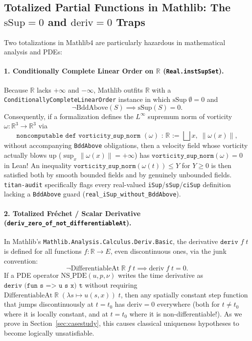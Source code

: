 \documentclass[11pt,a4paper]{article}
\theoremstyle{plain}
\theoremstyle{definition}
\begin{document}
\subsection{Totalized Partial Functions in Mathlib: The $\mathrm{sSup} = 0$ and $\mathrm{deriv} = 0$ Traps}

Two totalizations in Mathlib4 are particularly hazardous in mathematical analysis and PDEs:

\paragraph{1. Conditionally Complete Linear Order on $\mathbb{R}$ (\texttt{Real.instSupSet}).}
Because $\mathbb{R}$ lacks $+\infty$ and $-\infty$, Mathlib outfits $\mathbb{R}$ with a \texttt{ConditionallyCompleteLinearOrder} instance in which $\mathrm{sSup}\;\emptyset = 0$ and
\[
  \neg \mathrm{BddAbove}(S) \implies \mathrm{sSup}(S) = 0.
\]
Consequently, if a formalization defines the $L^\infty$ supremum norm of vorticity $\omega : \mathbb{R}^3 \to \mathbb{R}^3$ via
\[
  \texttt{noncomputable def vorticity\_sup\_norm }(\omega)\texttt{ : }\mathbb{R}\texttt{ := }\bigsqcup x,\; \|\omega(x)\|,
\]
without accompanying \texttt{BddAbove} obligations, then a velocity field whose vorticity actually blows up ($\sup_x \|\omega(x)\| = +\infty$) has $\texttt{vorticity\_sup\_norm}(\omega) = 0$ in Lean! An inequality $\texttt{vorticity\_sup\_norm}(\omega(t)) \le Y$ for $Y \ge 0$ is then satisfied both by smooth bounded fields and by genuinely unbounded fields. \texttt{titan-audit} specifically flags every real-valued \texttt{iSup}/\texttt{sSup}/\texttt{ciSup} definition lacking a \texttt{BddAbove} guard (\texttt{real\_iSup\_without\_BddAbove}).

\paragraph{2. Totalized Fr\'echet / Scalar Derivative (\texttt{deriv\_zero\_of\_not\_differentiableAt}).}
In Mathlib's \texttt{Mathlib.Analysis.Calculus.Deriv.Basic}, the derivative $\texttt{deriv } f\; t$ is defined for all functions $f : \mathbb{R} \to E$, even discontinuous ones, via the junk convention:
\[
  \neg \mathrm{DifferentiableAt}\;\mathbb{R}\;f\;t \implies \mathrm{deriv}\;f\;t = 0.
\]
If a PDE operator $\mathrm{NS\_PDE}(u, p, \nu)$ writes the time derivative as $\texttt{deriv (fun s => u s x) t}$ without requiring $\mathrm{DifferentiableAt}\;\mathbb{R}\;(\lambda s \mapsto u(s,x))\;t$, then any spatially constant step function that jumps discontinuously at $t = t_0$ has $\mathrm{deriv} = 0$ everywhere (both for $t \ne t_0$ where it is locally constant, and at $t = t_0$ where it is non-differentiable!). As we prove in Section~\ref{sec:casestudy}, this causes classical uniqueness hypotheses to become logically unsatisfiable.
\end{document}
